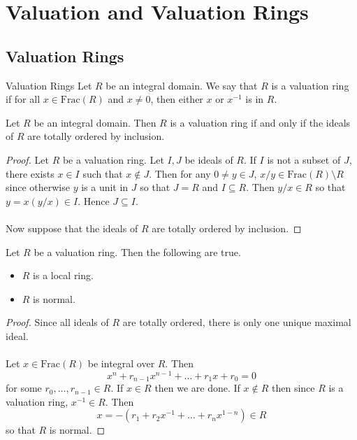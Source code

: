 \documentclass[a4paper]{article}
\begin{document}
\pagebreak
\section{Valuation and Valuation Rings}
\subsection{Valuation Rings}
\begin{defn}{Valuation Rings}{} Let $R$ be an integral domain. We say that $R$ is a valuation ring if for all $x\in\text{Frac}(R)$ and $x\neq 0$, then either $x$ or $x^{-1}$ is in $R$. 
\end{defn}

\begin{lmm}{}{} Let $R$ be an integral domain. Then $R$ is a valuation ring if and only if the ideals of $R$ are totally ordered by inclusion. 
\begin{proof}
Let $R$ be a valuation ring. Let $I,J$ be ideals of $R$. If $I$ is not a subset of $J$, there exists $x\in I$ such that $x\notin J$. Then for any $0\neq y\in J$, $x/y\in\text{Frac}(R)\setminus R$ since otherwise $y$ is a unit in $J$ so that $J=R$ and $I\subseteq R$. Then $y/x\in R$ so that $y=x(y/x)\in I$. Hence $J\subseteq I$. \\~\\

Now suppose that the ideals of $R$ are totally ordered by inclusion. 
\end{proof}
\end{lmm}

\begin{lmm}{}{} Let $R$ be a valuation ring. Then the following are true. 
\begin{itemize}
\item $R$ is a local ring. 
\item $R$ is normal. 
\end{itemize} 
\begin{proof}
Since all ideals of $R$ are totally ordered, there is only one unique maximal ideal. \\~\\

Let $x\in\text{Frac}(R)$ be integral over $R$. Then $$x^n+r_{n-1}x^{n-1}+\dots+r_1x+r_0=0$$ for some $r_0,\dots,r_{n-1}\in R$. If $x\in R$ then we are done. If $x\notin R$ then since $R$ is a valuation ring, $x^{-1}\in R$. Then $$x=-(r_1+r_2x^{-1}+\dots+r_nx^{1-n})\in R$$ so that $R$ is normal. 
\end{proof}
\end{lmm}
\end{document}
